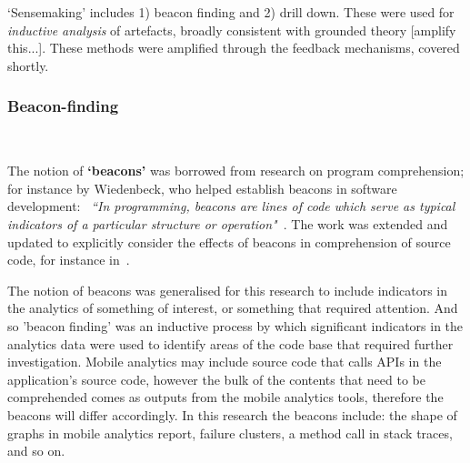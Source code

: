 `Sensemaking' includes 1) beacon finding and 2) drill down. These were used for \textit{inductive analysis} of artefacts, broadly consistent with grounded theory [amplify this...].  These methods were amplified through the feedback mechanisms, covered shortly. 



\subsubsection{Beacon-finding}~\label{section-beacon-finding-method} %

The notion of \textbf{`beacons'} was borrowed from research on program comprehension; for instance by Wiedenbeck, who helped establish beacons in software development: ~\emph{``In programming, beacons are lines of code which serve as typical indicators of a particular structure or operation"}~\citep[p.679]{WIEDENBECK1986_beacons_in_computer_program_comprehension}. The work was extended and updated to explicitly consider the effects of beacons in comprehension of source code, for instance in~\citealt{crosby2002_roles_beacons_play_in_comprehension_etc}.

The notion of beacons was generalised for this research to include indicators in the analytics of something of interest, or something that required attention.  And so 'beacon finding' was an inductive process by which significant indicators in the analytics data were used to identify areas of the code base that required further investigation.  Mobile analytics may include source code that calls APIs in the application's source code, however the bulk of the contents that need to be comprehended comes as outputs from the mobile analytics tools, therefore the beacons will differ accordingly. In this research the beacons include: the shape of graphs in mobile analytics report, failure clusters, a method call in stack traces, and so on.

